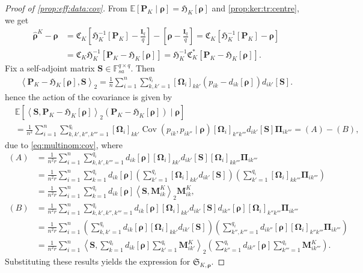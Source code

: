 \documentclass[noinfoline]{imsart}\setcounter{tocdepth}{2}
\renewcommand{\b}[1]{\mathbb{#1}} %
\newcommand{\m}[1]{\mathbf{#1}} %
\newcommand{\f}[1]{\mathfrak{#1}} %
\newcommand{\mb}[1]{\boldsymbol{#1}} %
\newcommand{\innpr}[2]{{\left\langle {#1},{#2}\right\rangle}} %
\newcommand{\Cov}{\operatorname{Cov}}
\theoremstyle{plain}
\begin{document}
\begin{appendix}
\begin{proof}[Proof of \cref{prop:eff:data:cov}]
From $\b{E}[\m{P}_K \mid \mb{\rho}] =  \f{H}_K [\mb{\rho}]$ and \cref{prop:ker:tr:centre}, we get
\begin{align*}
    \hat{\mb{\rho}}^{K} - \mb{\rho} &= \f{C}_{K} \left[ \f{H}_K^{-1}[\m{P}_K] - \frac{\m{I}_{q}}{q} \right] - \left[ \mb{\rho} - \frac{\m{I}_{q}}{q} \right] = \f{C}_{K} \left[ \f{H}_K^{-1}[\m{P}_K] - \mb{\rho} \right] \\
    &= \f{C}_{K} \f{H}_K^{-1} \left[ \m{P}_K - \f{H}_K [\mb{\rho}] \right] = \f{H}_K^{-1} \f{C}_{K}^{*}  \left[ \m{P}_K - \f{H}_K [\mb{\rho}] \right].
\end{align*}
Fix a self-adjoint matrix $\m{S} \in \b{F}_{sa}^{q \times q}$. Then
\begin{align*}
    \innpr{\m{P}_K - \f{H}_K [\mb{\rho}]}{\m{S}}_{2} = \frac{1}{n} \sum_{i=1}^{n} \sum_{k, k'=1}^{q_{i}} [\mb{\Omega}_i]_{kk'} (p_{ik} - d_{ik}[\mb{\rho}]) d_{ik'}[\m{S}].
\end{align*}
hence the action of the covariance is given by
\begin{align*}
    &\b{E}[\innpr{\m{S}}{\m{P}_{K} - \f{H}_K [\mb{\rho}]}_{2} (\m{P}_{K} - \f{H}_K [\mb{\rho}]) \mid \mb{\rho}] \\
    &= \frac{1}{n^{2}} \sum_{i=1}^{n} \sum_{k, k', k'', k''' =1}^{q_{i}} [\mb{\Omega}_i]_{kk'} \Cov (p_{ik}, p_{ik''}  \mid \mb{\rho}) [\mb{\Omega}_i]_{k''k'''} d_{ik'}[\m{S}] \m{\Pi}_{ik'''} = (A) - (B),
\end{align*}
due to \eqref{eq:multinom:cov}, where
\begin{align*}
    (A) &= \frac{1}{n^{2} r} \sum_{i=1}^{n} \sum_{k, k', k''' =1}^{q_{i}} d_{ik}[\mb{\rho}] [\mb{\Omega}_i]_{kk'}  d_{ik'}[\m{S}] [\mb{\Omega}_i]_{kk'''}  \m{\Pi}_{ik'''} \\
    &= \frac{1}{n^{2} r} \sum_{i=1}^{n} \sum_{k=1}^{q_{i}} d_{ik}[\mb{\rho}] \left( \sum_{k'=1}^{q_{i}} [\mb{\Omega}_i]_{kk'} d_{ik'}[\m{S}]  \right) \left( \sum_{k'=1}^{q_{i}}  [\mb{\Omega}_i]_{kk'''}  \m{\Pi}_{ik'''} \right) \\
    &= \frac{1}{n^{2} r} \sum_{i=1}^{n} \sum_{k=1}^{q_{i}} d_{ik}[\mb{\rho}] \innpr{\m{S}}{\m{M}_{ik}^{K}}_{2} \m{M}_{ik}^{K}, \\
    (B) &= \frac{1}{n^{2} r} \sum_{i=1}^{n} \sum_{k, k', k'', k''' =1}^{q_{i}} d_{ik}[\mb{\rho}] [\mb{\Omega}_i]_{kk'} d_{ik'}[\m{S}] d_{ik''}[\mb{\rho}] [\mb{\Omega}_i]_{k''k'''}  \m{\Pi}_{ik'''} \\
    &= \frac{1}{n^{2} r} \sum_{i=1}^{n} \left( \sum_{k, k' =1}^{q_{i}} d_{ik}[\mb{\rho}] [\mb{\Omega}_i]_{kk'} d_{ik'}[\m{S}] \right) \left( \sum_{k'', k''' =1}^{q_{i}} d_{ik''}[\mb{\rho}] [\mb{\Omega}_i]_{k''k'''}  \m{\Pi}_{ik'''} \right) \\
    &= \frac{1}{n^{2} r} \sum_{i=1}^{n} \innpr{\m{S}}{ \sum_{k=1}^{q_{i}} d_{ik}[\mb{\rho}] \sum_{k'=1}^{q_{i}} \m{M}_{ik'}^{K}}_{2} \left( \sum_{k''=1}^{q_{i}} d_{ik''}[\mb{\rho}] \sum_{k'''=1}^{q_{i}} \m{M}_{ik'''}^{K} \right).
\end{align*}
Substituting these results yields the expression for $\f{S}_{K, \mb{\rho}}$.
\end{proof}



\end{appendix}
\end{document}
